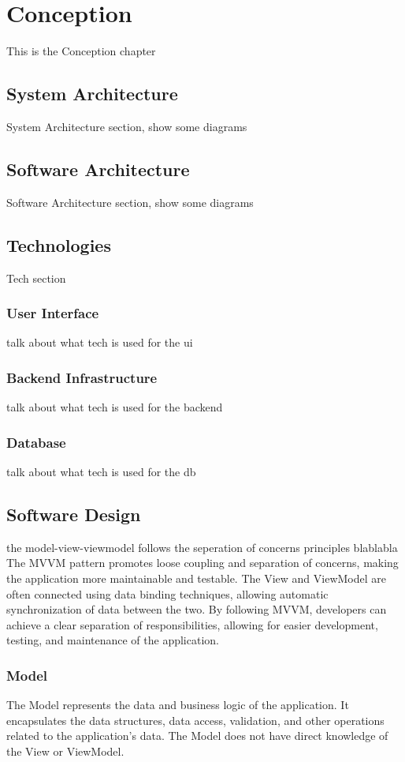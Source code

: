 \chapter{Conception}

This is the Conception chapter 

\section{System Architecture}
System Architecture section, show some diagrams

\section{Software Architecture}
Software Architecture section, show some diagrams

\section{Technologies}
Tech section
\subsection{User Interface}
talk about what tech is used for the ui
\subsection{Backend Infrastructure}
talk about what tech is used for the backend
\subsection{Database}
talk about what tech is used for the db


\section{Software Design}
the model-view-viewmodel follows the seperation of concerns principles blablabla
The MVVM pattern promotes loose coupling and separation of concerns, making the application more maintainable and testable. The View and ViewModel are often connected using data binding techniques, allowing automatic synchronization of data between the two.
By following MVVM, developers can achieve a clear separation of responsibilities, allowing for easier development, testing, and maintenance of the application.
\subsection{Model}
The Model represents the data and business logic of the application. It encapsulates the data structures, data access, validation, and other operations related to the application's data. The Model does not have direct knowledge of the View or ViewModel.
